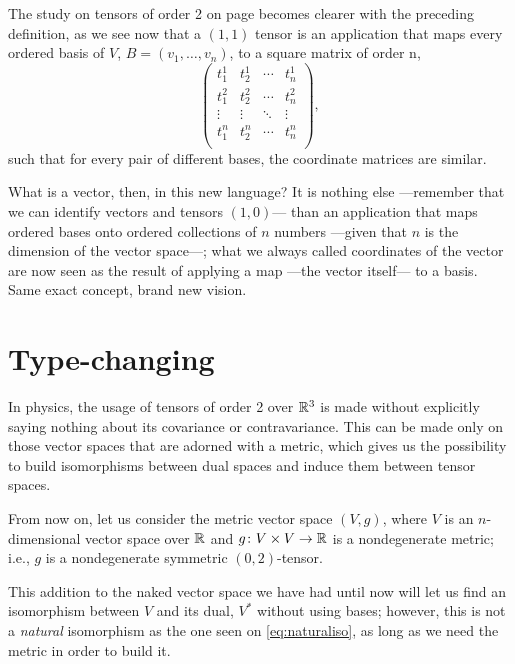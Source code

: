 The study on tensors of order 2 on page \pageref{sub:order2} becomes clearer with the preceding definition, as we see now that a $(1,1)$ tensor is an application that maps every ordered basis of $V$, $B=(v_1, \dots, v_n)$, to a square matrix of order n,
\[
	\begin{pmatrix}
	t^1_1 & t^1_2 & \cdots & t^1_n \\
	t^2_1 & t^2_2 & \cdots & t^2_n \\
	\vdots & \vdots & \ddots & \vdots \\
	t^n_1 & t^n_2 & \cdots & t^n_n \\
	\end{pmatrix},
\]
such that for every pair of different bases, the coordinate matrices are similar.

What is a vector, then, in this new language? It is nothing else ---remember that we can identify vectors and tensors $(1,0)$--- than an application that maps ordered bases onto ordered collections of $n$ numbers ---given that $n$ is the dimension of the vector space---; what we always called coordinates of the vector are now seen as the result of applying a map ---the vector itself--- to a basis. Same exact concept, brand new vision.
	
\section{Type-changing}

In physics, the usage of tensors of order 2 over $\mathbb{R}^3$ is made without explicitly saying nothing about its covariance or contravariance. This can be made only on those vector spaces that are adorned with a metric, which gives us the possibility to build isomorphisms between dual spaces and induce them between tensor spaces.

From now on, let us consider the metric vector space $(V, g)$, where $V$ is an $n$-dimensional vector space over $\mathbb{R}$ and $g \colon V \times V \to \mathbb{R}$ is a nondegenerate metric; i.e., $g$ is a nondegenerate symmetric $(0,2)$-tensor.

This addition to the naked vector space we have had until now will let us find an isomorphism between $V$ and its dual, $V^*$ without using bases; however, this is not a \emph{natural} isomorphism as the one seen on \autoref{eq:naturaliso}, as long as we need the metric in order to build it.

